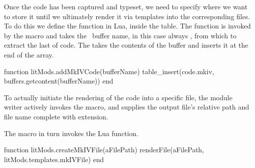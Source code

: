 \let\oldStopMkIVAltCode=\stopMkIVAltCode
\def\stopMkIVAltCode{%
  \oldStopMkIVAltCode%
 \directlua{thirddata.literateModules.addMkIVCode('_typing_')}}

 \stopMkIVCode

 Once the  code has been captured and typeset, we need to 
specify where we want to store it until we ultimately render it via 
templates into the corresponding  files. To do this we define 
the  function in Lua, inside the  table. 
The  function is invoked by the \type{\stopMkIVCode} 
macro and takes the \ConTeXt\ buffer name, in this case always 
, from which to extract the last  of 
 code. The  takes the contents of the buffer 
and inserts it at the end of the  array. 

\startLuaCode
function litMods.addMkIVCode(bufferName)
  table_insert(code.mkiv, buffers.getcontent(bufferName))
end
\stopLuaCode

 
To actually initiate the rendering of the  code into a specific 
file, the module writer actively invokes the \type{\createMkIVFile} macro, 
and supplies the output file's relative path and file name complete with 
extension. 

\startMkIVCode


\def\createMkIVFile[#1]{
  \directlua{thirddata.literateModules.createMkIVFile(#1)}
}

\stopMkIVCode

The \type{\createMkIVFile} macro in turn invokes the  
Lua function. 

\startLuaCode
function litMods.createMkIVFile(aFilePath)
  renderFile(aFilePath, litMods.templates.mkIVFile)
end
\stopLuaCode

\startLuaTemplate


\stopLuaTemplate

\stopchapter